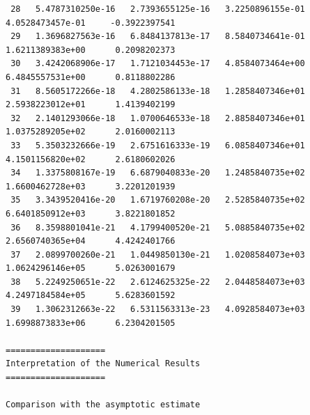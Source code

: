 \documentclass[12pt,a4paper]{article}
\begin{document}
\begin{lstlisting}
 28   5.4787310250e-16   2.7393655125e-16   3.2250896155e-01   4.0528473457e-01     -0.3922397541
 29   1.3696827563e-16   6.8484137813e-17   8.5840734641e-01   1.6211389383e+00      0.2098202373
 30   3.4242068906e-17   1.7121034453e-17   4.8584073464e+00   6.4845557531e+00      0.8118802286
 31   8.5605172266e-18   4.2802586133e-18   1.2858407346e+01   2.5938223012e+01      1.4139402199
 32   2.1401293066e-18   1.0700646533e-18   2.8858407346e+01   1.0375289205e+02      2.0160002113
 33   5.3503232666e-19   2.6751616333e-19   6.0858407346e+01   4.1501156820e+02      2.6180602026
 34   1.3375808167e-19   6.6879040833e-20   1.2485840735e+02   1.6600462728e+03      3.2201201939
 35   3.3439520416e-20   1.6719760208e-20   2.5285840735e+02   6.6401850912e+03      3.8221801852
 36   8.3598801041e-21   4.1799400520e-21   5.0885840735e+02   2.6560740365e+04      4.4242401766
 37   2.0899700260e-21   1.0449850130e-21   1.0208584073e+03   1.0624296146e+05      5.0263001679
 38   5.2249250651e-22   2.6124625325e-22   2.0448584073e+03   4.2497184584e+05      5.6283601592
 39   1.3062312663e-22   6.5311563313e-23   4.0928584073e+03   1.6998873833e+06      6.2304201505

====================
Interpretation of the Numerical Results
====================

Comparison with the asymptotic estimate


\end{lstlisting}
\end{document}
